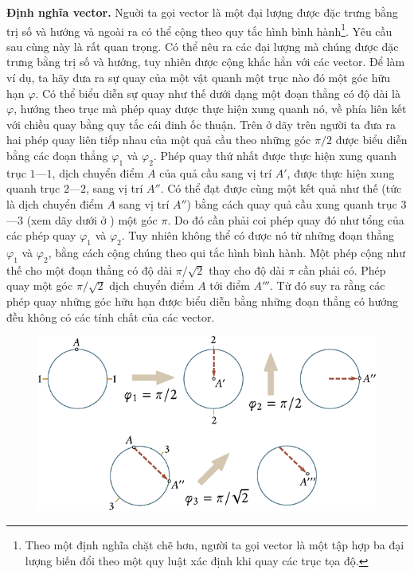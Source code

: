 \textbf{Định nghĩa vector.} Nguời ta gọi vector là một đại lượng được đặc trưng bằng trị số và hướng và ngoài ra có thể cộng theo quy tắc hình bình hành\footnote{Theo một định nghĩa chặt chẽ hơn, người ta gọi vector là một tập hợp ba đại lượng biến đổi theo một quy luật xác định khi quay các trục tọa độ.}. Yêu cầu sau cùng này là rất quan trọng. Có thể nêu ra các đại lượng mà chúng được đặc trưng bằng trị số và hướng, tuy nhiên được cộng khắc hẳn với các vector. Để làm ví dụ, ta hãy đưa ra sự quay của một vật quanh một trục nào đó một góc hữu hạn $\varphi$. Có thể biểu diễn sự quay như thế dưới dạng một đoạn thẳng có độ dài là $\varphi$, hướng theo trục mà phép quay được thực hiện xung quanh nó, về phía liên kết với chiều quay bằng quy tắc cái đinh ốc thuận. Trên  ở dãy trên người ta đưa ra hai phép quay liên tiếp nhau của một quả cầu theo những góc $\pi/2$ được biểu diễn bằng các đoạn thẳng $\varphi_1$ và $\varphi_2$. Phép quay thứ nhất được thực hiện xung quanh trục $1$---$1$, dịch chuyển điểm  $A$ của quả cầu sang vị trí $A'$, được thực hiện xung quanh trục $2$---$2$, sang vị trí $A''$. Có thể đạt được cùng một kết quả như thế (tức là dịch chuyển điểm $A$ sang vị trí $A''$) bằng cách quay quả cầu xung quanh trục $3$---$3$ (xem dãy dưới ở ) một góc $\pi$. Do đó cần phải coi phép quay đó như tổng của các phép quay $\varphi_1$ và $\varphi_2$. Tuy nhiên không thể có được nó từ những đoạn thẳng $\varphi_1$ và $\varphi_2$, bằng cách cộng chúng theo qui tắc hình bình hành. Một phép cộng như thế cho một đoạn thẳng có độ dài $\pi/\sqrt{2}$ thay cho độ dài $\pi$ cần phải có. Phép quay một góc $\pi/\sqrt{2}$ dịch chuyển điểm $A$ tới điểm $A'''$. Từ đó suy ra rằng các phép quay những góc hữu hạn được biểu diễn bằng những đoạn thẳng có hướng đều không có các tính chất của các vector.

\begin{figure}[!htb]
	\begin{center}
		\includegraphics[scale=0.9]{figures/ch_01/fig_1_4.pdf}
		\caption[]{}
		\label{fig:1_4}
	\end{center}
\end{figure}

